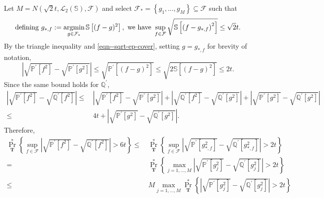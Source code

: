 Let \(M = N \left( \sqrt{2} t, \mathscr{L}_{2} (\mathbb{S}), \mathcal{F}
\right)\) and select \(\mathcal{F}_{\ast} = \left\{ g_{1}, \dots, g_{M} \right\}
\subseteq \mathcal{F}\) such that
\begin{equation}
  \text{defining } g_{\ast, f} := \operatorname*{argmin}_{g \in \mathcal{F}_{\ast}}
  \mathbb{S} \left[ (f - g)^{2} \right], \text{ we have } \sup_{f \in
  \mathcal{F}} \sqrt{\mathbb{S} \left[ \left( f - g_{\ast, f} \right)^{2}
  \right]} \leq \sqrt{2} t.
  \label{eqn--sqrt-ep-cover}
\end{equation}
By the triangle inequality and \eqref{eqn--sqrt-ep-cover}, setting \(g =
g_{\ast, f}\) for brevity of notation,
\begin{equation*}
  \left| \sqrt{\mathbb{P}^{\prime} \left[ f^{2} \right]} -
  \sqrt{\mathbb{P}^{\prime} \left[ g^{2} \right]} \right| \leq
  \sqrt{\mathbb{P}^{\prime} \left[ (f - g)^{2} \right]} \leq \sqrt{2 \mathbb{S}
  \left[ (f - g)^{2} \right]} \leq 2 t.
\end{equation*}
Since the same bound holds for \(\mathbb{Q}^{\prime}\),
\begin{align*}
  \left| \sqrt{\mathbb{P}^{\prime} \left[ f^{2} \right]} -
  \sqrt{\mathbb{Q}^{\prime} \left[ f^{2} \right]} \right| \leq
  & \, \left| \sqrt{\mathbb{P}^{\prime} \left[ f^{2} \right]} -
  \sqrt{\mathbb{P}^{\prime} \left[ g^{2} \right]} \right| +
  \left| \sqrt{\mathbb{Q}^{\prime} \left[ f^{2} \right]} -
  \sqrt{\mathbb{Q}^{\prime} \left[ g^{2} \right]} \right| +
  \left| \sqrt{\mathbb{P}^{\prime} \left[ g^{2} \right]} -
  \sqrt{\mathbb{Q}^{\prime} \left[ g^{2} \right]} \right| \\
  \leq
  & \, 4 t + \left| \sqrt{\mathbb{P}^{\prime} \left[ g^{2} \right]} -
  \sqrt{\mathbb{Q}^{\prime} \left[ g^{2} \right]} \right|.
\end{align*}
Therefore,
\begin{align*}
  \Pr_{\mathbf{T}}^{\ast} \left\{ \sup_{f \in \mathcal{F}} \left|
  \sqrt{\mathbb{P}^{\prime} \left[ f^{2} \right]} - \sqrt{\mathbb{Q}^{\prime}
  \left[ f^{2} \right]} \right| > 6 t \right\} \leq
  & \, \Pr_{\mathbf{T}}^{\ast} \left\{ \sup_{f \in \mathcal{F}} \left|
  \sqrt{\mathbb{P}^{\prime} \left[ g_{\ast, f}^{2} \right]} -
  \sqrt{\mathbb{Q}^{\prime} \left[ g_{\ast, f}^{2} \right]} \right| > 2 t
  \right\} \\
  =
  & \, \Pr_{\mathbf{T}}^{\ast} \left\{ \max_{j = 1, \dots, M} \left|
  \sqrt{\mathbb{P}^{\prime} \left[ g_{j}^{2} \right]} -
  \sqrt{\mathbb{Q}^{\prime} \left[ g_{j}^{2} \right]} \right| > 2 t \right\} \\
  \leq
  & \, M \max_{j = 1, \dots, M} \Pr_{\mathbf{T}}^{\ast} \left\{ \left|
  \sqrt{\mathbb{P}^{\prime} \left[ g_{j}^{2} \right]} -
  \sqrt{\mathbb{Q}^{\prime} \left[ g_{j}^{2} \right]} \right| > 2 t \right\}
\end{align*}
